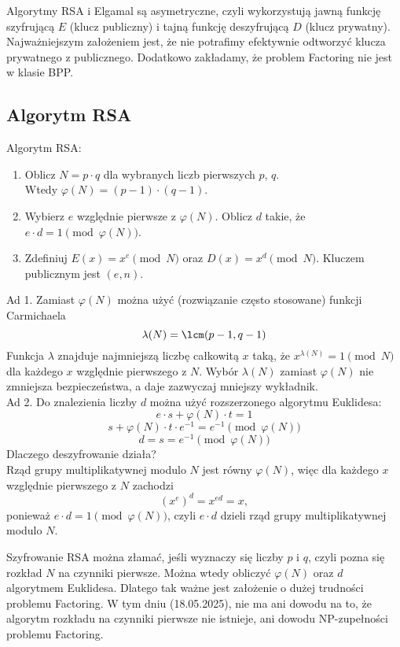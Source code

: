 Algorytmy RSA i Elgamal są asymetryczne, czyli wykorzystują jawną funkcję szyfrującą \( E \) (klucz publiczny) i tajną funkcję deszyfrującą \( D \) (klucz prywatny).
Najważniejszym założeniem jest, że nie potrafimy efektywnie odtworzyć klucza prywatnego z publicznego. Dodatkowo zakładamy, że problem Factoring nie jest w klasie BPP.

\subsection{Algorytm RSA}
\begin{greyframe}
    Algorytm RSA:
    \begin{enumerate}
        \item Oblicz \( N = p \cdot q \) dla wybranych liczb pierwszych \( p \), \( q \). \\
        Wtedy \( \varphi(N) = (p-1) \cdot (q-1) \).
        \item Wybierz \( e \) względnie pierwsze z \( \varphi(N) \). Oblicz \( d \) takie, że  \( e\cdot d = 1 \pmod{\varphi(N)} \).
        \item Zdefiniuj \( E(x) = x^e \pmod{N} \) oraz \( D(x) = x^d \pmod{N} \). Kluczem publicznym jest \( (e, n) \).
    \end{enumerate}
\end{greyframe}

Ad 1. Zamiast \( \varphi(N) \) można użyć (rozwiązanie często stosowane) funkcji Carmichaela
\[
    \lambda(N) = \lcm(p - 1, q - 1)
\]
Funkcja \( \lambda \) znajduje najmniejszą liczbę całkowitą \( x \) taką, że \( x^{\lambda(N)} = 1 \pmod{N} \) dla każdego \( x \) względnie pierwszego z \( N \).
Wybór \( \lambda(N) \) zamiast \( \varphi(N) \) nie zmniejsza bezpieczeństwa, a daje zazwyczaj mniejszy wykładnik. \\
Ad 2. Do znalezienia liczby \( d \) można użyć rozszerzonego algorytmu Euklidesa:
\[
    e \cdot s + \varphi(N) \cdot t = 1
\]
\[
    s + \varphi(N) \cdot t \cdot e^{-1} = e^{-1} \pmod{\varphi(N)}
\]
\[
    d = s = e^{-1} \pmod{\varphi(N)}
\]
Dlaczego deszyfrowanie działa? \\
Rząd grupy multiplikatywnej modulo \( N \) jest równy \( \varphi(N) \), więc dla każdego \( x \) względnie pierwszego z \( N \) zachodzi
\[
    (x^{e})^d = x^{ed} = x,
\]
ponieważ \( e \cdot d = 1 \pmod{\varphi(N)} \), czyli \( e \cdot d \) dzieli rząd grupy multiplikatywnej modulo \( N \).

Szyfrowanie RSA można złamać, jeśli wyznaczy się liczby \( p \) i \( q \), czyli pozna się rozkład \( N \) na czynniki pierwsze.
Można wtedy obliczyć \( \varphi(N) \) oraz \( d \) algorytmem Euklidesa. Dlatego tak ważne jest założenie o dużej trudności problemu Factoring.
W tym dniu (18.05.2025), nie ma ani dowodu na to, że algorytm rozkładu na czynniki pierwsze nie istnieje, ani dowodu NP-zupełności problemu Factoring.

